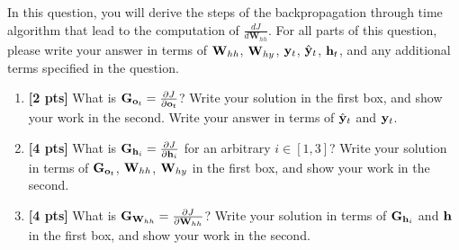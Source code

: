 \begin{enumerate}
In this question, you will derive the steps of the backpropagation through time algorithm that lead to the computation of $\frac{dJ}{d\textbf{W}_{hh}}$. For all parts of this question, please write your answer in terms of $\mathbf{W}_{hh}$, $\mathbf{W}_{hy}$, $\mathbf{y}_t$, $\hat{\mathbf{y}}_t$, $\mathbf{h}_t$, and any additional terms specified in the question. 

\clearpage

\begin{enumerate}
    \item \textbf{[2 pts]} What is $\mathbf{G}_{\mathbf{o}_t} = \frac{\partial J}{\partial \mathbf{o}_t}$? Write your solution in the first box, and show your work in the second. Write your answer in terms of $\hat{\mathbf{y}}_t$ and $\mathbf{y}_t$.
    

    \begin{your_solution}[title=$\frac{\partial J}{\partial \ov_t}$,height=2.5cm,width=10cm]

    \end{your_solution}
    
    \begin{your_solution}[title=Work,height=6cm,width=15cm]

    \end{your_solution}
    
    \item \textbf{[4 pts]} What is $\mathbf{G}_{\mathbf{h}_i} = \frac{\partial J}{\partial \mathbf{h}_i}$ for an arbitrary $i \in [1,3]$? Write your solution in terms of $\mathbf{G}_{\mathbf{o}_t}$, $\mathbf{W}_{hh}$, $\mathbf{W}_{hy}$ in the first box, and show your work in the second. 
    
    \begin{your_solution}[title=$\frac{\partial J}{\partial \hv_i}$,height=2.5cm,width=8.5cm]

    \end{your_solution}
    
    \begin{your_solution}[title=Work,height=8cm,width=15cm]

    \end{your_solution}

    \clearpage
    
    \item \textbf{[4 pts]} What is $\mathbf{G}_{\mathbf{W}_{hh}} = \frac{\partial J}{\partial \mathbf{W}_{hh}}$? Write your solution in terms of $\mathbf{G}_{\mathbf{h}_i}$ and $\mathbf{h}$ in the first box, and show your work in the second.
    
    \begin{your_solution}[title=$\frac{\partial J}{\partial W_{hh}}$,height=2.5cm,width=10.5cm]

    \end{your_solution}
    
    \begin{your_solution}[title=Work,height=18cm,width=15cm]

    \end{your_solution}
\end{enumerate}

\end{enumerate}

